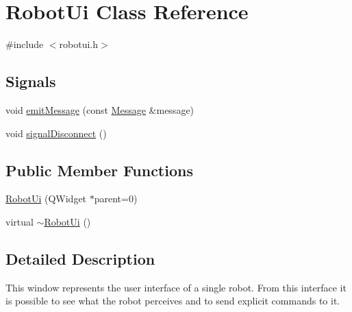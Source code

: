 \hypertarget{classRobotUi}{
\section{RobotUi Class Reference}
\label{classRobotUi}
}


{\ttfamily \#include $<$robotui.h$>$}

\subsection*{Signals}
\begin{DoxyCompactItemize}
\item 
void \hyperlink{classRobotUi_a9c734c06e4c79796caf59a3c62cb81d6}{emitMessage} (const \hyperlink{classMessage}{Message} \&message)
\item 
void \hyperlink{classRobotUi_ac2fef8f371040f851ddb1f6001d14ab2}{signalDisconnect} ()
\end{DoxyCompactItemize}
\subsection*{Public Member Functions}
\begin{DoxyCompactItemize}
\item 
\hyperlink{classRobotUi_afcc29c9e857ddc5ec1b24ac313fbdd55}{RobotUi} (QWidget $\ast$parent=0)
\item 
virtual \hyperlink{classRobotUi_a9c3cb7af4dd51a5ab9f279beaa54957a}{$\sim$RobotUi} ()
\end{DoxyCompactItemize}


\subsection{Detailed Description}
This window represents the user interface of a single robot. From this interface it is possible to see what the robot perceives and to send explicit commands to it. 

